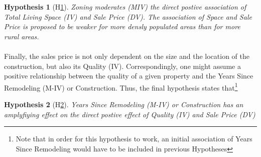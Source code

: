\documentclass{article}
\newtheorem{hyp}{Hypothesis}
\begin{document}
\begin{hyp}[H\ref{hyp:second}] \label{hyp:second}
Zoning moderates (MIV) the direct postive association of Total Living Space (IV) and Sale Price (DV). The association of Space and Sale Price is proposed to be weaker for more densly populated areas than for more rural areas. 
\end{hyp}

\begin{center}
\end{center}


\indent \paragraph{} Finally, the sales price is not only dependent on the size and the location of the construction, but also its Quality (IV). Correspondingly, one might assume a positive relationship between the quality of a given property and the Years Since Remodeling (M-IV) or Construction. Thus, the final hypothesis states that\footnote{Note that in order for this hypothesis to work, an initial association of Years Since Remodeling would have to be included in previous Hypotheses}
\begin{hyp}[H\ref{hyp:third}] \label{hyp:third}
Years Since Remodeling (M-IV) or Construction has an amplyfiying effect on the direct postive effect of Quality (IV) and Sale Price (DV)
\end{hyp}

\begin{center}
\end{center}
\end{document}
